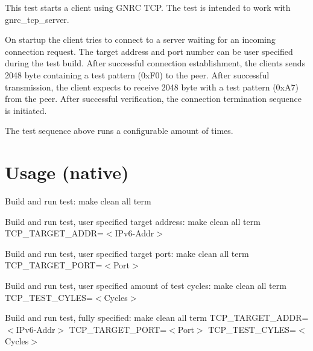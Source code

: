 This test starts a client using G\+N\+RC T\+CP. The test is intended to work with gnrc\+\_\+tcp\+\_\+server.

On startup the client tries to connect to a server waiting for an incoming connection request. The target address and port number can be user specified during the test build. After successful connection establishment, the clients sends 2048 byte containing a test pattern (0x\+F0) to the peer. After successful transmission, the client expects to receive 2048 byte with a test pattern (0x\+A7) from the peer. After successful verification, the connection termination sequence is initiated.

The test sequence above runs a configurable amount of times.

\section*{Usage (native) }

Build and run test\+: make clean all term

Build and run test, user specified target address\+: make clean all term T\+C\+P\+\_\+\+T\+A\+R\+G\+E\+T\+\_\+\+A\+D\+DR=$<$I\+Pv6-\/\+Addr$>$

Build and run test, user specified target port\+: make clean all term T\+C\+P\+\_\+\+T\+A\+R\+G\+E\+T\+\_\+\+P\+O\+RT=$<$\+Port$>$

Build and run test, user specified amount of test cycles\+: make clean all term T\+C\+P\+\_\+\+T\+E\+S\+T\+\_\+\+C\+Y\+L\+ES=$<$\+Cycles$>$

Build and run test, fully specified\+: make clean all term T\+C\+P\+\_\+\+T\+A\+R\+G\+E\+T\+\_\+\+A\+D\+DR=$<$I\+Pv6-\/\+Addr$>$ T\+C\+P\+\_\+\+T\+A\+R\+G\+E\+T\+\_\+\+P\+O\+RT=$<$\+Port$>$ T\+C\+P\+\_\+\+T\+E\+S\+T\+\_\+\+C\+Y\+L\+ES=$<$\+Cycles$>$ 
